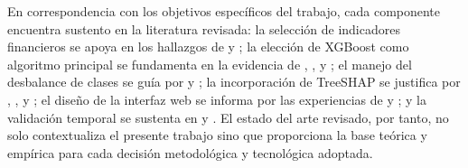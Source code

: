 \documentclass[12pt, letterpaper]{article}
\begin{document}
En correspondencia con los objetivos espec\'ificos del trabajo, cada componente encuentra sustento en la literatura revisada: la selecci\'on de indicadores financieros se apoya en los hallazgos de \citet{Cultrera2016} y \citet{PtakChmielewska2020}; la elecci\'on de XGBoost como algoritmo principal se fundamenta en la evidencia de \citet{Dasilas2024}, \citet{Boumhidi2025}, \citet{Sujatha2025} y \citet{ChenGuestrin2016}; el manejo del desbalance de clases se gu\'ia por \citet{Sun2020} y \citet{Kristanti2025}; la incorporaci\'on de TreeSHAP se justifica por \citet{Bussmann2020}, \citet{Pathi2025}, \citet{LundbergTreeSHAP2020} y \citet{Deng2024}; el dise\~no de la interfaz web se informa por las experiencias de \citet{MayorgaLira2023} y \citet{BaumontDeOliveira2021}; y la validaci\'on temporal se sustenta en \citet{Bortolotti2024} y \citet{Mahesh2025}. El estado del arte revisado, por tanto, no solo contextualiza el presente trabajo sino que proporciona la base te\'orica y emp\'irica para cada decisi\'on metodol\'ogica y tecnol\'ogica adoptada.


\end{document}
